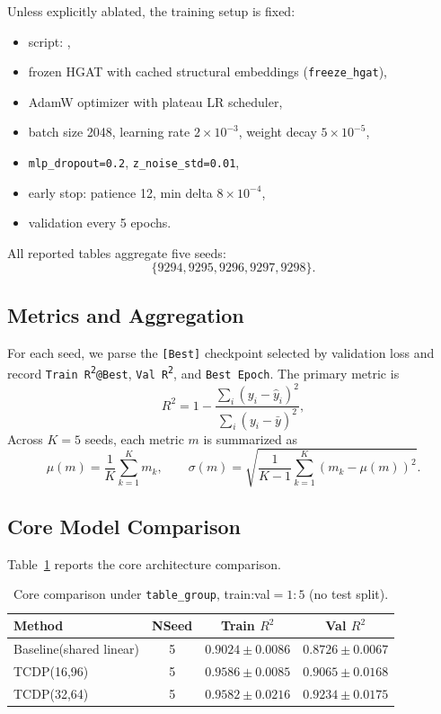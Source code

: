 ﻿\documentclass[10pt,a4paper]{article}
\begin{document}
Unless explicitly ablated, the training setup is fixed:
\begin{itemize}[leftmargin=1.2em]
  \item script: ,
  \item frozen HGAT with cached structural embeddings (\texttt{freeze\_hgat}),
  \item AdamW optimizer with plateau LR scheduler,
  \item batch size 2048, learning rate $2\times10^{-3}$, weight decay $5\times10^{-5}$,
  \item \texttt{mlp\_dropout=0.2}, \texttt{z\_noise\_std=0.01},
  \item early stop: patience 12, min delta $8\times10^{-4}$,
  \item validation every 5 epochs.
\end{itemize}
All reported tables aggregate five seeds:
\[
\{9294,9295,9296,9297,9298\}.
\]

\subsection{Metrics and Aggregation}

For each seed, we parse the \texttt{[Best]} checkpoint selected by validation loss and record
\texttt{Train R\textsuperscript{2}@Best}, \texttt{Val R\textsuperscript{2}}, and \texttt{Best Epoch}.
The primary metric is
\begin{equation}
R^2 = 1-\frac{\sum_{i}(y_i-\hat{y}_i)^2}{\sum_{i}(y_i-\bar{y})^2},
\end{equation}
Across $K=5$ seeds, each metric $m$ is summarized as
\begin{equation}
\mu(m)=\frac{1}{K}\sum_{k=1}^K m_k,\qquad
\sigma(m)=\sqrt{\frac{1}{K-1}\sum_{k=1}^K (m_k-\mu(m))^2}.
\end{equation}

\subsection{Core Model Comparison}

Table~\ref{tab:core_compare_en} reports the core architecture comparison.

\begin{table}[htbp]
\centering
\small
\caption{Core comparison under \texttt{table\_group}, train:val$=1:5$ (no test split).}
\label{tab:core_compare_en}
\begin{tabular}{lccc}
\toprule
Method & NSeed & Train $R^2$ & Val $R^2$ \\
\midrule
Baseline(shared linear) & 5 & $0.9024\pm0.0086$ & $0.8726\pm0.0067$ \\
TCDP(16,96) & 5 & $0.9586\pm0.0085$ & $0.9065\pm0.0168$ \\
TCDP(32,64) & 5 & $0.9582\pm0.0216$ & $\mathbf{0.9234\pm0.0175}$ \\
\bottomrule
\end{tabular}
\end{table}
\end{document}
